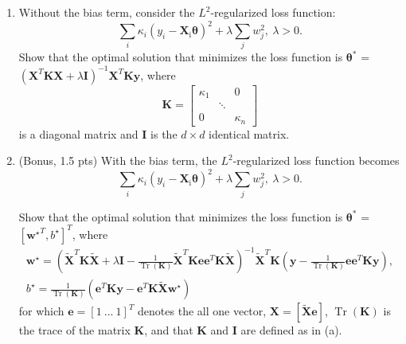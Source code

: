 \documentclass{article}
\DeclareMathOperator{\Tr}{Tr}
\def\matI{{\mathbf I}}
\def\matK{{\mathbf K}}
\begin{document}
\begin{enumerate}[label=(\alph*)]
\item Without the bias term, consider the $L^2$-regularized loss function:
$$\sum_i \kappa_i \left(y_i-\boldsymbol{X}_{\mathrm{i}} \boldsymbol{\theta}\right)^2+\lambda \sum_j w_j^2, \ \lambda > 0.$$
Show that the optimal solution that minimizes the loss function is $\boldsymbol{\theta^*}$ = $\left( \boldsymbol{X}^T \boldsymbol{K} \boldsymbol{X} + \lambda \boldsymbol{I}\right)^{-1} \boldsymbol{X}^T \boldsymbol{K} \boldsymbol{y}$, where
\begin{equation*}
  \boldsymbol{K} =
  \begin{bmatrix}
    \kappa_{1} & & 0\\
    & \ddots & \\
    0 & & \kappa_{n}
  \end{bmatrix}
\end{equation*}
%
is a diagonal matrix and $\boldsymbol{I}$ is the $d \times d$ identical matrix. 
%
\item (Bonus, 1.5 pts) With the bias term, the $L^2$-regularized loss function becomes
$$\sum_i \kappa_i \left(y_i-\boldsymbol{X}_{\mathrm{i}} \boldsymbol{\theta} \right)^2+\lambda \sum_j w_j^2, \ \lambda > 0.$$

Show that the optimal solution that minimizes the loss function is $\boldsymbol{\theta^*} $ =  $[ \boldsymbol{w^{\star}}^T, b^{\star}]^T$, where 
\begin{gather*}
\boldsymbol{w^{\star}}=\left( \boldsymbol{\tilde{X}}^T \boldsymbol{K} \boldsymbol{\tilde{X}} + \lambda \boldsymbol{I} - \frac{1}{\Tr{(\boldsymbol{K})}} \boldsymbol{\tilde{X}}^T \boldsymbol{K} \boldsymbol{e} \boldsymbol{e}^T \boldsymbol{K} \boldsymbol{\tilde{X}} \right)^{-1} \boldsymbol{\tilde{X}}^T \boldsymbol{K} \left( \boldsymbol{y} - \frac{1}{\Tr{(\boldsymbol{K})}} \boldsymbol{e} \boldsymbol{e}^T \boldsymbol{K} \boldsymbol{y} \right),\\
b^{\star} = \frac{1}{\Tr{(\boldsymbol{K})}} \left( \boldsymbol{e}^T \boldsymbol{K} \boldsymbol{y} - \boldsymbol{e}^T \boldsymbol{K} \boldsymbol{\tilde{X}} \boldsymbol{w^{\star}} \right)
\end{gather*}
%
for which $\boldsymbol{e}= [1 \ ... \ 1]^T$ denotes the all one vector, $\boldsymbol{X} = [\boldsymbol{\tilde{X}} \boldsymbol{e}] $, $\Tr{(\boldsymbol{K})}$ is the trace of the matrix $\boldsymbol{K}$, and that $\matK$ and $\matI$ are defined as in (a).
\end{enumerate}
\end{document}
